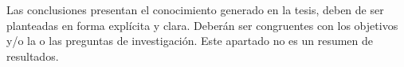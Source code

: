 Las conclusiones presentan el conocimiento generado en la tesis, deben de ser planteadas en forma explícita y clara.
Deberán ser congruentes con los objetivos y/o la o las preguntas de investigación.
Este apartado no es un resumen de resultados.